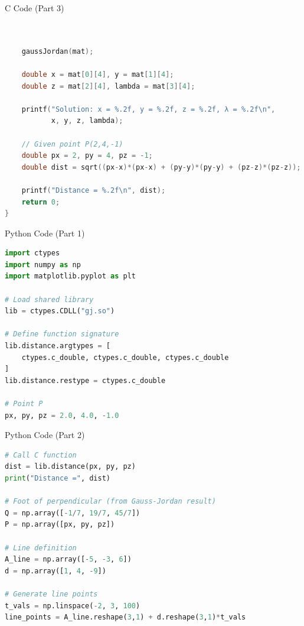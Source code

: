 \documentclass{beamer}
\begin{document}
\begin{frame}[fragile]{C Code (Part 3)}
\begin{lstlisting}[language=C]


    gaussJordan(mat);

    double x = mat[0][4], y = mat[1][4];
    double z = mat[2][4], lambda = mat[3][4];

    printf("Solution: x = %.2f, y = %.2f, z = %.2f, λ = %.2f\n",
           x, y, z, lambda);

    // Given point P(2,4,-1)
    double px = 2, py = 4, pz = -1;
    double dist = sqrt((px-x)*(px-x) + (py-y)*(py-y) + (pz-z)*(pz-z));

    printf("Distance = %.2f\n", dist);
    return 0;
}
\end{lstlisting}
\end{frame}


\begin{frame}[fragile]{Python Code (Part 1)}
\begin{lstlisting}[language=Python]
import ctypes
import numpy as np
import matplotlib.pyplot as plt

# Load shared library
lib = ctypes.CDLL("gj.so")

# Define function signature
lib.distance.argtypes = [
    ctypes.c_double, ctypes.c_double, ctypes.c_double
]
lib.distance.restype = ctypes.c_double

# Point P
px, py, pz = 2.0, 4.0, -1.0
\end{lstlisting}
\end{frame}

\begin{frame}[fragile]{Python Code (Part 2)}
\begin{lstlisting}[language=Python]
# Call C function
dist = lib.distance(px, py, pz)
print("Distance =", dist)

# Foot of perpendicular (from Gauss-Jordan result)
Q = np.array([-1/7, 19/7, 45/7])
P = np.array([px, py, pz])

# Line definition
A_line = np.array([-5, -3, 6])
d = np.array([1, 4, -9])

# Generate line points
t_vals = np.linspace(-2, 3, 100)
line_points = A_line.reshape(3,1) + d.reshape(3,1)*t_vals
\end{lstlisting}
\end{frame}
\end{document}
